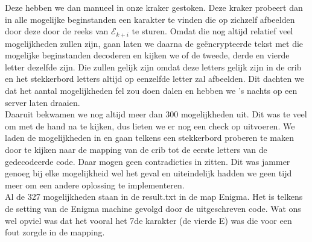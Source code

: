 \documentclass[fleqn]{article}
\begin{document}
	Deze hebben we dan manueel in onze kraker gestoken. Deze kraker probeert dan in alle mogelijke beginstanden een karakter te vinden die op zichzelf afbeelden door deze door de reeks van $\mathcal{E}_{k+i}$ te sturen. Omdat die nog altijd relatief veel mogelijkheden zullen zijn, gaan laten we daarna de ge\"{e}ncrypteerde tekst met die mogelijke beginstanden decoderen en kijken we of de tweede, derde en vierde letter dezelfde zijn. Die zullen gelijk zijn omdat deze letters gelijk zijn in de crib en het stekkerbord letters altijd op eenzelfde letter zal afbeelden. Dit dachten we dat het aantal mogelijkheden fel zou doen dalen en hebben we 's nachts op een server laten draaien.\\
	Daaruit bekwamen we nog altijd meer dan 300 mogelijkheden uit. Dit was te veel om met de hand na te kijken, dus lieten we er nog een check op uitvoeren.
	We laden de mogelijkheden in en gaan telkens een stekkerbord proberen te maken door te kijken naar de mapping van de crib tot de eerste letters van de gedecodeerde code. Daar mogen geen contradicties in zitten. Dit was jammer genoeg bij elke mogelijkheid wel het geval en uiteindelijk hadden we geen tijd meer om een andere oplossing te implementeren.
	\\
	Al de 327 mogelijkheden staan in de result.txt in de map Enigma. Het is telkens de setting van de Enigma machine gevolgd door de uitgeschreven code. Wat ons wel opviel was dat het vooral het 7de karakter (de vierde E) was die voor een fout zorgde in de mapping.
	
	
\end{document}
